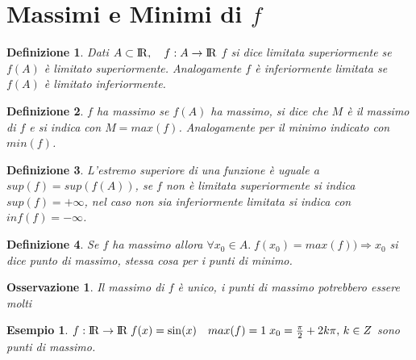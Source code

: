 \documentclass[12pt, a4paper]{article}
\theoremstyle{break}
\newtheorem{definition}{Definizione}[subsection]
\newtheorem{example}{Esempio}[subsection]
\newtheorem{observation}{Osservazione}[subsection]
\newcommand\R{{\rm I\!R}}
\begin{document}
    \section{Massimi e Minimi di $f$}
    \begin{definition}
        Dati $A\subset\R,\quad f:A\rightarrow \R$ $f$ si dice limitata superiormente se $f(A)$ è limitato superiormente.\newline 
        Analogamente $f$ è inferiormente limitata se $f(A)$ è limitato inferiormente.
    \end{definition}
    \begin{definition}
        $f$ ha massimo se $f(A)$ ha massimo, si dice che $M$ è il massimo di $f$ e si indica con $M = max(f)$.\newline
        Analogamente per il minimo indicato con $min(f)$.
    \end{definition}
    \begin{definition}
        L'estremo superiore di una funzione è uguale a $sup(f) = sup(f(A))$, se $f$ non è limitata superiormente si indica $sup(f) = +\infty$, nel caso non sia inferiormente limitata si indica con $inf(f)  = -\infty$.
    \end{definition}
    \begin{definition}
        Se $f$ ha massimo allora $\forall x_0\in A.\; f(x_0) = max(f)) \Rightarrow x_0$ si dice punto di massimo, stessa cosa per i punti di minimo.
    \end{definition}
    \begin{observation}
        Il massimo di $f$ è unico, i punti di massimo potrebbero essere molti
    \end{observation}
    \newpage
    \begin{example}
        $f:\R\rightarrow\R\; f(x) = \sin(x)\quad max(f) = 1\; x_0 = \frac{\pi}{2}+2k\pi,\, k\in Z$ sono punti di massimo.
    \end{example}
    \begin{figure}[!htb]
        \centering
    \end{figure}
\end{document}
